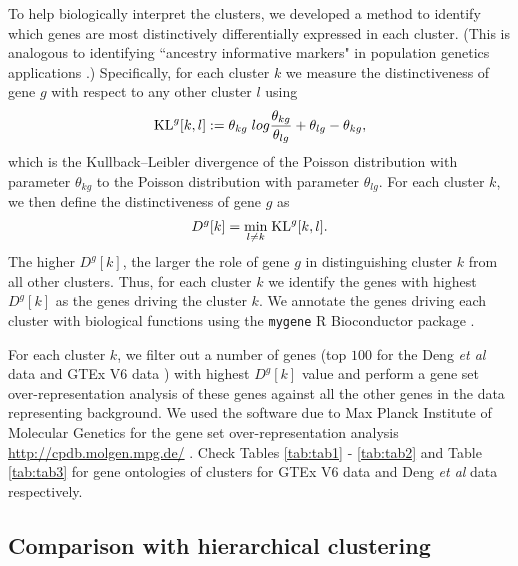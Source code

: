To help biologically interpret the clusters, we developed a method to identify which genes are most distinctively differentially expressed in each cluster. 
(This is analogous to identifying ``ancestry informative markers" in population genetics applications \cite{Rosenberg2005}.)
 Specifically, for each cluster $k$ we measure the distinctiveness of gene $g$ with respect to any other cluster $l$ using
\begin{equation}
\text{KL}^{g} [k,l] : = \theta_{kg} \; log \frac{\theta_{kg}}{\theta_{lg}} + \theta_{lg} - \theta_{kg},
\end{equation}
which is the Kullback--Leibler divergence of the Poisson distribution with parameter $\theta_{kg}$ to the Poisson distribution with parameter $\theta_{lg}$. 
For each cluster $k$, we then define the distinctiveness of gene $g$ as 
\begin{equation}
D^{g}[k] = \underset{l \neq k}{\min} \; \text{KL}^{g} [k, l].
\end{equation}
The higher $D^g[k]$, the larger the role of gene $g$ in distinguishing cluster $k$ from all other clusters. 
Thus, for each cluster $k$ we identify the genes with highest $D^{g}[k]$ as the genes driving the cluster $k$. 
We annotate the genes driving each cluster with biological functions using the {\tt mygene} R Bioconductor package  \cite{Thompson2014}. 

For each cluster $k$, we filter out a number of genes (top $100$ for the Deng \textit{et al} data \cite{Deng2014} and GTEx V6 data \cite{GTEX2013}) with highest $D^{g}[k]$ value and perform a gene set over-representation analysis of these genes against all the other genes in the data representing background. We used the software due to Max Planck Institute of Molecular Genetics for the gene set over-representation analysis \url{http://cpdb.molgen.mpg.de/} \cite{Kamburov2013} \cite{Pentchev2010}. Check Tables \ref{tab:tab1} - \ref{tab:tab2} and Table  \ref{tab:tab3} for gene ontologies of clusters for GTEx V6 data and Deng \textit{et al} data respectively. 

\subsection{Comparison with hierarchical clustering}

